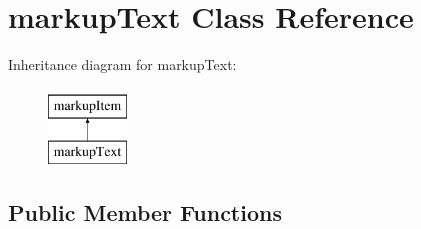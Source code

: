 \hypertarget{classmarkupText}{
\section{markupText Class Reference}
\label{classmarkupText}
}
Inheritance diagram for markupText:\begin{figure}[H]
\begin{center}
\leavevmode
\includegraphics[height=2.000000cm]{classmarkupText}
\end{center}
\end{figure}
\subsection*{Public Member Functions}
